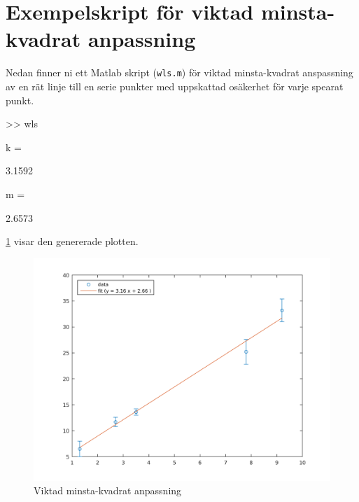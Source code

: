 \section{Exempelskript för viktad minsta-kvadrat anpassning}
\label{sec:matlab-wls}
Nedan finner ni ett Matlab skript ({\tt wls.m}) för viktad
minsta-kvadrat anspassning av en rät linje till en serie punkter med
uppskattad osäkerhet för varje spearat punkt.


\begin{terminaloutput}
>> wls

k =

    3.1592


m =

    2.6573
\end{terminaloutput}

\cref{fig:matlab-wls} visar den genererade plotten.

\begin{figure}
  \centering
  \includegraphics[scale=0.5]{matlab/wls_fit.png}
  \caption{Viktad minsta-kvadrat anpassning}
  \label{fig:matlab-wls}
\end{figure}

